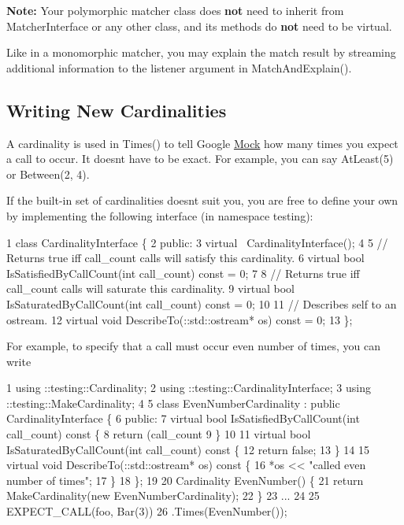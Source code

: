 {\bfseries Note\+:} Your polymorphic matcher class does {\bfseries not} need to inherit from {\ttfamily Matcher\+Interface} or any other class, and its methods do {\bfseries not} need to be virtual.

Like in a monomorphic matcher, you may explain the match result by streaming additional information to the {\ttfamily listener} argument in {\ttfamily Match\+And\+Explain()}.

\subsection*{Writing New Cardinalities}

A cardinality is used in {\ttfamily Times()} to tell Google \hyperlink{class_mock}{Mock} how many times you expect a call to occur. It doesn\textquotesingle{}t have to be exact. For example, you can say {\ttfamily At\+Least(5)} or {\ttfamily Between(2, 4)}.

If the built-\/in set of cardinalities doesn\textquotesingle{}t suit you, you are free to define your own by implementing the following interface (in namespace {\ttfamily testing})\+:


\begin{DoxyCode}
1 class CardinalityInterface \{
2  public:
3   virtual ~CardinalityInterface();
4 
5   // Returns true iff call\_count calls will satisfy this cardinality.
6   virtual bool IsSatisfiedByCallCount(int call\_count) const = 0;
7 
8   // Returns true iff call\_count calls will saturate this cardinality.
9   virtual bool IsSaturatedByCallCount(int call\_count) const = 0;
10 
11   // Describes self to an ostream.
12   virtual void DescribeTo(::std::ostream* os) const = 0;
13 \};
\end{DoxyCode}


For example, to specify that a call must occur even number of times, you can write


\begin{DoxyCode}
1 using ::testing::Cardinality;
2 using ::testing::CardinalityInterface;
3 using ::testing::MakeCardinality;
4 
5 class EvenNumberCardinality : public CardinalityInterface \{
6  public:
7   virtual bool IsSatisfiedByCallCount(int call\_count) const \{
8     return (call\_count %
9   \}
10 
11   virtual bool IsSaturatedByCallCount(int call\_count) const \{
12     return false;
13   \}
14 
15   virtual void DescribeTo(::std::ostream* os) const \{
16     *os << "called even number of times";
17   \}
18 \};
19 
20 Cardinality EvenNumber() \{
21   return MakeCardinality(new EvenNumberCardinality);
22 \}
23 ...
24 
25   EXPECT\_CALL(foo, Bar(3))
26       .Times(EvenNumber());
\end{DoxyCode}


